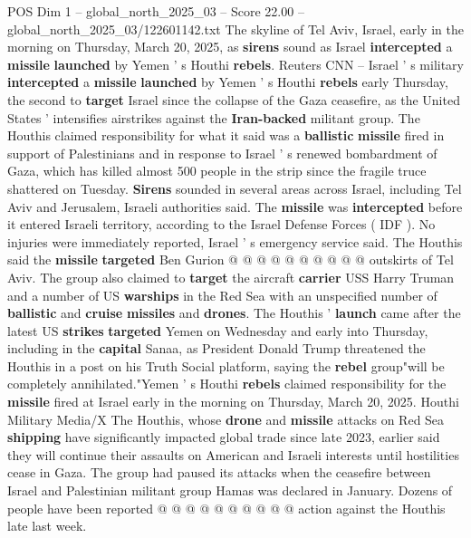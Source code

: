 \begin{textsample}{POS Dim 1 – global\_north\_2025\_03 – Score 22.00 – global\_north\_2025\_03/122601142.txt}  \label{ex:f1_pos_421}
The skyline of Tel Aviv, Israel, early in the morning on Thursday, March 20, 2025, as \textbf{sirens} sound as Israel \textbf{intercepted} a \textbf{missile} \textbf{launched} by Yemen ' s Houthi \textbf{rebels}.
Reuters CNN -- Israel ' s military \textbf{intercepted} a \textbf{missile} \textbf{launched} by Yemen ' s Houthi \textbf{rebels} early Thursday, the second to \textbf{target} Israel since the collapse of the Gaza ceasefire, as the United States ' intensifies airstrikes against the \textbf{Iran-backed} militant group.
The Houthis claimed responsibility for what it said was a \textbf{ballistic} \textbf{missile} fired in support of Palestinians and in response to Israel ' s renewed bombardment of Gaza, which has killed almost 500 people in the strip since the fragile truce shattered on Tuesday. \textbf{Sirens} sounded in several areas across Israel, including Tel Aviv and Jerusalem, Israeli authorities said.
The \textbf{missile} was \textbf{intercepted} before it entered Israeli territory, according to the Israel Defense Forces ( IDF ).
No injuries were immediately reported, Israel ' s emergency service said.
The Houthis said the \textbf{missile} \textbf{targeted} Ben Gurion @ @ @ @ @ @ @ @ @ @ outskirts of Tel Aviv.
The group also claimed to \textbf{target} the aircraft \textbf{carrier} USS Harry Truman and a number of US \textbf{warships} in the Red Sea with an unspecified number of \textbf{ballistic} and \textbf{cruise} \textbf{missiles} and \textbf{drones}.
The Houthis ' \textbf{launch} came after the latest US \textbf{strikes} \textbf{targeted} Yemen on Wednesday and early into Thursday, including in the \textbf{capital} Sanaa, as President Donald Trump threatened the Houthis in a post on his Truth Social platform, saying the \textbf{rebel} group"will be completely annihilated."Yemen ' s Houthi \textbf{rebels} claimed responsibility for the \textbf{missile} fired at Israel early in the morning on Thursday, March 20, 2025.
Houthi Military Media/X The Houthis, whose \textbf{drone} and \textbf{missile} attacks on Red Sea \textbf{shipping} have significantly impacted global trade since late 2023, earlier said they will continue their assaults on American and Israeli interests until hostilities cease in Gaza.
The group had paused its attacks when the ceasefire between Israel and Palestinian militant group Hamas was declared in January.
Dozens of people have been reported @ @ @ @ @ @ @ @ @ @ action against the Houthis late last week.

\end{textsample}
